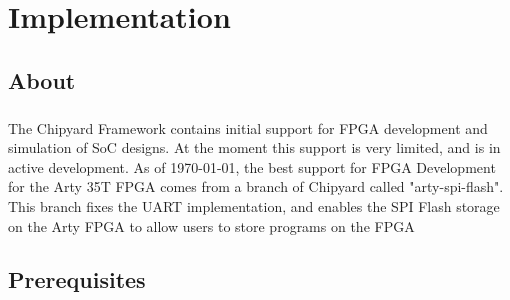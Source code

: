 \chapter{\texorpdfstring{}{FPGA} Implementation}\label{chap:FPGA_Implementation}

\section{About}\label{sec:About}
\paragraph{}The Chipyard Framework contains initial support for FPGA development and simulation of SoC designs. At the moment this support is very limited, and is in active development. As of \today, the best support for FPGA Development for the Arty 35T FPGA comes from a branch of Chipyard called "arty-spi-flash". This branch fixes the UART implementation, and enables the SPI Flash storage on the Arty FPGA to allow users to store programs on the FPGA
\section{Prerequisites}\label{sec:Prerequisites}


